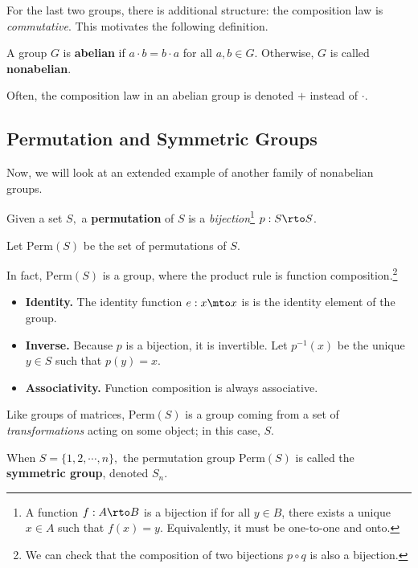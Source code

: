 For the last two groups, there is additional structure: the composition law is \emph{commutative}. This motivates the following definition.
\begin{definition}
A group $G$ is \textbf{abelian} if $a \cdot b = b \cdot a$ for all $a, b \in G.$ Otherwise, $G$ is called \textbf{nonabelian}.
\end{definition}

Often, the composition law in an abelian group is denoted $+$ instead of $\cdot.$


\subsection{Permutation and Symmetric Groups}
Now, we will look at an extended example of another family of nonabelian groups.

\begin{definition}
Given a set $S,$ a \textbf{permutation} of $S$ is a \emph{bijection}\footnote{A function $f: A \rto B$ is a bijection if for all $y \in B$, there exists a unique $x \in A$ such that $f(x) = y$. Equivalently, it must be one-to-one and onto.} $p: S \rto S$.
\end{definition}

\begin{definition}
Let $\text{Perm}(S)$ be the set of permutations of $S$.
\end{definition}

In fact, $\text{Perm}(S)$ is a group, where the product rule is function composition.\footnote{We can check that the composition of two bijections $p \circ q$ is also a bijection.}
\begin{itemize}
    \item \textbf{Identity.} The identity function $e: x \mto x$ is is the identity element of the group.

    \item \textbf{Inverse.} Because $p$ is a bijection, it is invertible. Let $p^{-1}(x)$ be the unique $y \in S$ such that $p(y) = x.$

    \item \textbf{Associativity.} Function composition is always associative.
\end{itemize}

Like groups of matrices, $\text{Perm}(S)$ is a group coming from a set of \emph{transformations} acting on some object; in this case, $S$.

\begin{definition}
When $S = \{1, 2, \cdots, n\},$ the permutation group $\text{Perm}(S)$ is called the \textbf{symmetric group}, denoted $S_n.$
\end{definition}

